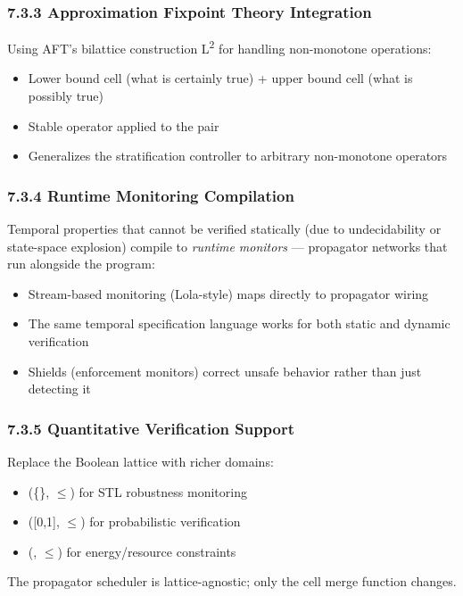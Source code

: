 \documentclass[11pt]{article}
\begin{document}
\subsubsection{7.3.3 Approximation Fixpoint Theory Integration}
\label{sec:org244ceaf}

Using AFT's bilattice construction L\textsuperscript{2} for handling non-monotone operations:
\begin{itemize}
\item Lower bound cell (what is certainly true) + upper bound cell (what is
possibly true)
\item Stable operator applied to the pair
\item Generalizes the stratification controller to arbitrary non-monotone
operators
\end{itemize}
\subsubsection{7.3.4 Runtime Monitoring Compilation}
\label{sec:org02781cd}

Temporal properties that cannot be verified statically (due to undecidability
or state-space explosion) compile to \emph{runtime monitors} --- propagator networks
that run alongside the program:
\begin{itemize}
\item Stream-based monitoring (Lola-style) maps directly to propagator wiring
\item The same temporal specification language works for both static and dynamic
verification
\item Shields (enforcement monitors) correct unsafe behavior rather than just
detecting it
\end{itemize}
\subsubsection{7.3.5 Quantitative Verification Support}
\label{sec:orgbc47f4a}

Replace the Boolean lattice with richer domains:
\begin{itemize}
\item (\overline\{\}, \(\le\)) for STL robustness monitoring
\item ([0,1], \(\le\)) for probabilistic verification
\item (, \(\le\)) for energy/resource constraints
\end{itemize}

The propagator scheduler is lattice-agnostic; only the cell merge function
changes.
\end{document}
